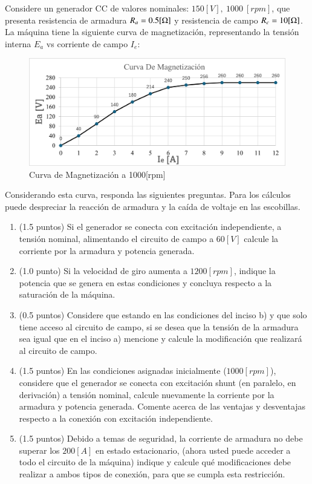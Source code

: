 Considere un generador CC de valores nominales: $\displaystyle 150[ V] ,\ 1000\ [ rpm]$, que presenta resistencia de armadura $\displaystyle R_{a} =0.5[ {\ohm}]$ y resistencia de campo $\displaystyle R_{c} =10[ {\ohm}]$. La máquina tiene la siguiente curva de magnetización, representando la tensión interna $E_a$ vs corriente de campo $I_e$:

\begin{figure}
    \centering
    \includegraphics[width=0.8\linewidth]{img/CM_CC2.png}
    \caption{Curva de Magnetización a 1000[rpm]}
\end{figure}



Considerando esta curva, responda las siguientes preguntas. Para los cálculos puede despreciar la reacción de armadura y la caída de voltaje en las escobillas.

\begin{enumerate}[label=\alph*)]
    \item(1.5 puntos) Si el generador se conecta con excitación independiente, a tensión nominal, alimentando el circuito de campo a  $\displaystyle 60[ V]$ calcule la corriente por la armadura y potencia generada.
    \item(1.0 punto) Si la velocidad de giro aumenta a $\displaystyle 1200[ rpm]$, indique la potencia que se genera en estas condiciones y concluya respecto a la saturación de la máquina.
    \item(0.5 puntos) Considere que estando en las condiciones del inciso b) y que solo tiene acceso al circuito de campo, si se desea que la tensión de la armadura sea igual que en el inciso a) mencione y calcule la modificación que realizará al circuito de campo.
    \item(1.5 puntos) En las condiciones asignadas inicialmente ($\displaystyle 1000[ rpm]$), considere que el generador se conecta con excitación shunt (en paralelo, en derivación) a tensión nominal, calcule nuevamente la corriente por la armadura y potencia generada. Comente acerca de las ventajas y desventajas respecto a la conexión con excitación independiente.
    \item(1.5 puntos) Debido a temas de seguridad, la corriente de armadura no debe superar los $\displaystyle 200[ A]$ en estado estacionario, (ahora usted puede acceder a todo el circuito de la máquina) indique y calcule qué modificaciones debe realizar a ambos tipos de conexión, para que se cumpla esta restricción.
\end{enumerate} 
